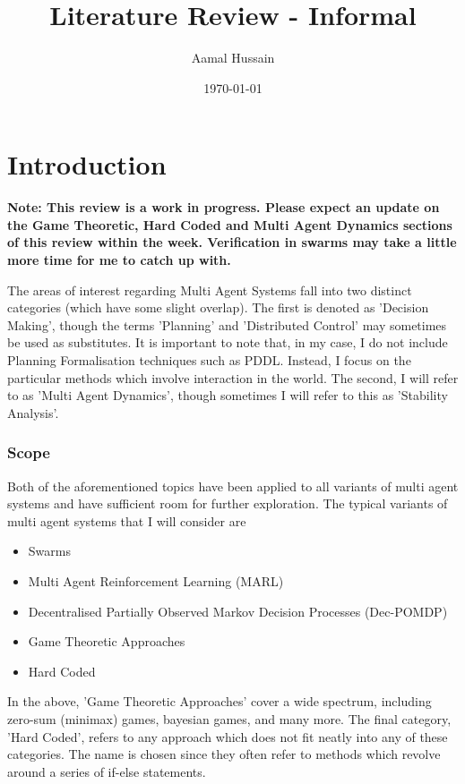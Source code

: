 \documentclass[preprint,8pt]{report}
\title{Literature Review - Informal}
\author{Aamal Hussain}
\date{\today}
\begin{document}
\maketitle
\tableofcontents

\chapter*{Introduction}

\textbf{Note: This review is a work in progress. Please expect an update on the Game Theoretic, Hard Coded and Multi Agent Dynamics sections of this review within the week. Verification in swarms may take a little more time for me to catch up with.} \newline

The areas of interest regarding Multi Agent Systems fall into two distinct categories (which have some slight overlap). The first is denoted as 'Decision Making', though the terms 'Planning' and 'Distributed Control' may sometimes be used as substitutes. It is important to note that, in my case, I do not include Planning Formalisation techniques such as PDDL. Instead, I focus on the particular methods which involve interaction in the world. The second, I will refer to as 'Multi Agent Dynamics', though sometimes I will refer to this as 'Stability Analysis'. 

\subsection*{Scope}

Both of the aforementioned topics have been applied to all variants of multi agent systems and have sufficient room for further exploration. The typical variants of multi agent systems that I will consider are

\begin{itemize}
    \item Swarms
    \item Multi Agent Reinforcement Learning (MARL)
    \item Decentralised Partially Observed Markov Decision Processes (Dec-POMDP)
    \item Game Theoretic Approaches
    \item Hard Coded
\end{itemize}

In the above, 'Game Theoretic Approaches' cover a wide spectrum, including zero-sum (minimax) games, bayesian games, and many more. The final category, 'Hard Coded', refers to any approach which does not fit neatly into any of these categories. The name is chosen since they often refer to methods which revolve around a series of if-else statements.
\end{document}
